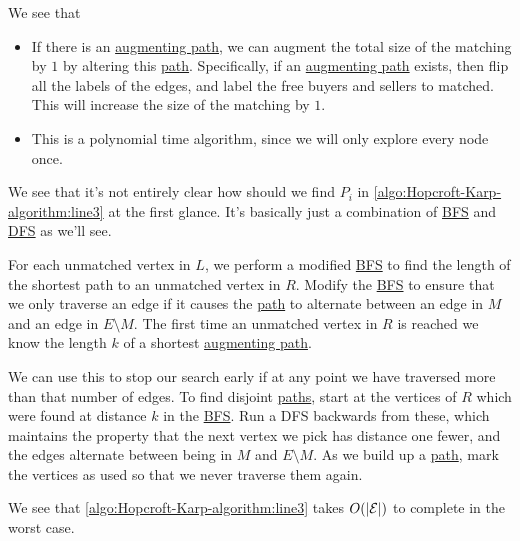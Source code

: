 \begin{intuition}
	We see that
	\begin{itemize}
		\item If there is an \hyperref[def:augmenting-path]{augmenting path}, we can augment the total size of the matching by
		      \(1\) by altering this \hyperref[def:path]{path}. Specifically, if an \hyperref[def:augmenting-path]{augmenting path}
		      exists, then flip all the labels of the edges, and label the free buyers and sellers to matched. This
		      will increase the size of the matching by \(1\).
		\item This is a polynomial time algorithm, since we will only explore every node once.
	\end{itemize}
\end{intuition}

\begin{remark}\label{rmk:lec25-1}
	We see that it's not entirely clear how should we find \(P_i\) in \autoref{algo:Hopcroft-Karp-algorithm:line3} at the first glance. It's basically just a
	combination of \hyperref[algo:BFS]{BFS} and \hyperref[rmk:DFS]{DFS} as we'll see.
\end{remark}
\begin{explanation}
	For each unmatched vertex in \(L\), we perform a modified \hyperref[algo:BFS]{BFS} to find the length of the shortest path to an unmatched vertex in \(R\). Modify the \hyperref[algo:BFS]{BFS}
	to ensure that we only traverse an edge if it causes the \hyperref[def:path]{path} to alternate between an edge in \(M\) and an edge in \(E\setminus M\).
	The first time an unmatched vertex in \(R\) is reached we know the length \(k\) of a shortest \hyperref[def:augmenting-path]{augmenting path}.

	We can use this to stop our search early if at any point we have traversed more than that number of edges. To find disjoint \hyperref[def:path]{paths},
	start at the vertices of \(R\) which were found at distance \(k\) in the \hyperref[algo:BFS]{BFS}. Run a DFS backwards from these, which maintains the property that the
	next vertex we pick has distance one fewer, and the edges alternate between being in \(M\) and \(E\setminus M\).
	As we build up a \hyperref[def:path]{path}, mark the vertices as used so that we never traverse them again.
\end{explanation}

\begin{remark}
	We see that \autoref{algo:Hopcroft-Karp-algorithm:line3} takes \(O(\left\vert \mathcal{\MakeUppercase{e}} \right\vert )\) to complete in the worst case.
\end{remark}

